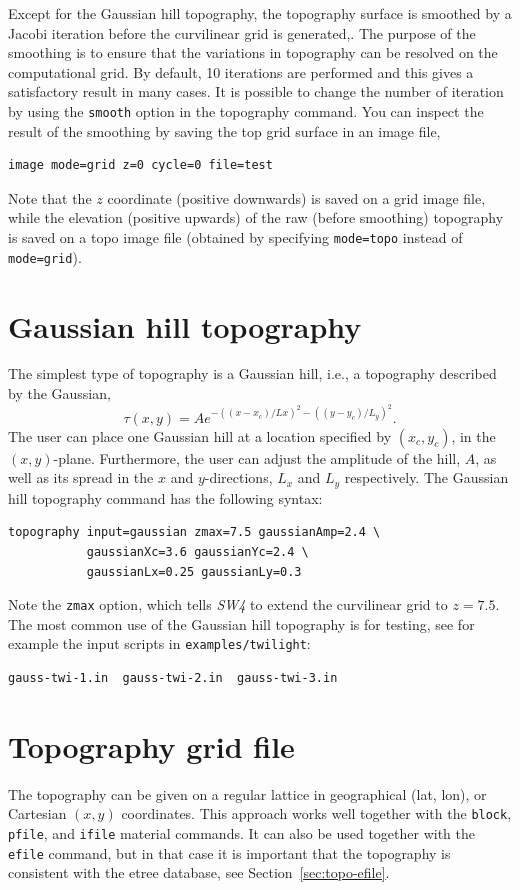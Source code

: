 \documentclass[11pt]{report}
\begin{document}
Except for the Gaussian hill topography, the topography surface is smoothed by a Jacobi iteration
before the curvilinear grid is generated,. The purpose of the smoothing is to ensure that the
variations in topography can be resolved on the computational grid. By default, 10 iterations are
performed and this gives a satisfactory result in many cases. It is possible to change the number of
iteration by using the \verb+smooth+ option in the topography command. You can inspect the result of
the smoothing by saving the top grid surface in an image file,
\begin{verbatim}
image mode=grid z=0 cycle=0 file=test
\end{verbatim}
Note that the $z$ coordinate (positive downwards) is saved on a grid image file, while the elevation
(positive upwards) of the raw (before smoothing) topography is saved on a topo image file (obtained by
specifying \verb+mode=topo+ instead of \verb+mode=grid+).

\section{Gaussian hill topography}\label{sec:topo-gauss-hill}
The simplest type of topography is a Gaussian hill, i.e., a topography described by the Gaussian,
$$
  \tau(x,y)= A e^{-( (x-x_c)/Lx )^2 - ( (y-y_c)/L_y )^2}.
$$
The user can place one Gaussian hill at a location specified by $(x_c,y_c)$, in the $(x,y)$-plane.
Furthermore, the user can adjust the amplitude of the hill, $A$, as well as
its spread in the $x$ and $y$-directions, $L_x$ and $L_y$ respectively. 
The Gaussian hill topography command has the following syntax:
\begin{verbatim}
topography input=gaussian zmax=7.5 gaussianAmp=2.4 \
           gaussianXc=3.6 gaussianYc=2.4 \
           gaussianLx=0.25 gaussianLy=0.3
\end{verbatim}
Note the \verb+zmax+ option, which tells \emph{SW4} to extend the curvilinear grid to $z=7.5$.
The most common use of the Gaussian hill topography is for testing, see for example the input
scripts in \verb+examples/twilight+:
\begin{verbatim}
gauss-twi-1.in  gauss-twi-2.in  gauss-twi-3.in 
\end{verbatim}

\section{Topography grid file}\label{sec:topo-gridfile}
The topography can be given on a regular lattice in geographical (lat, lon), or Cartesian $(x, y)$
coordinates. This approach works well together with the \verb+block+, \verb+pfile+, and \verb+ifile+
material commands. It can also be used together with the \verb+efile+ command, but in that case it is important
that the topography is consistent with the etree database, see Section~\ref{sec:topo-efile}.
\end{document}
